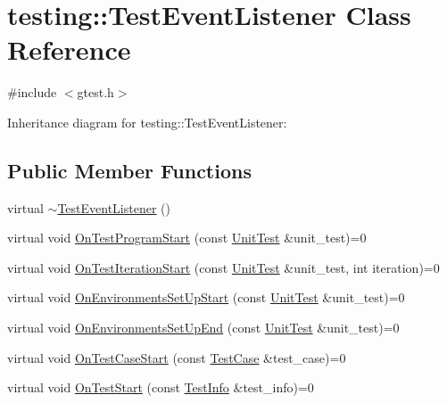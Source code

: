 \hypertarget{classtesting_1_1_test_event_listener}{}\section{testing\+:\+:Test\+Event\+Listener Class Reference}
\label{classtesting_1_1_test_event_listener}


{\ttfamily \#include $<$gtest.\+h$>$}



Inheritance diagram for testing\+:\+:Test\+Event\+Listener\+:
\subsection*{Public Member Functions}
\begin{DoxyCompactItemize}
\item 
virtual \hyperlink{classtesting_1_1_test_event_listener_a4512d19e7a108ec4926239ec1ea85d63}{$\sim$\+Test\+Event\+Listener} ()
\item 
virtual void \hyperlink{classtesting_1_1_test_event_listener_a5f6c84f39851e8a603a2d2e10063816b}{On\+Test\+Program\+Start} (const \hyperlink{classtesting_1_1_unit_test}{Unit\+Test} \&unit\+\_\+test)=0
\item 
virtual void \hyperlink{classtesting_1_1_test_event_listener_a60cc09b7907cb329d152eb5e7133bdeb}{On\+Test\+Iteration\+Start} (const \hyperlink{classtesting_1_1_unit_test}{Unit\+Test} \&unit\+\_\+test, int iteration)=0
\item 
virtual void \hyperlink{classtesting_1_1_test_event_listener_aa6502e534919605be45f26a6daf9a40c}{On\+Environments\+Set\+Up\+Start} (const \hyperlink{classtesting_1_1_unit_test}{Unit\+Test} \&unit\+\_\+test)=0
\item 
virtual void \hyperlink{classtesting_1_1_test_event_listener_aaa1021d75f5dbf3f05c829c1cc520341}{On\+Environments\+Set\+Up\+End} (const \hyperlink{classtesting_1_1_unit_test}{Unit\+Test} \&unit\+\_\+test)=0
\item 
virtual void \hyperlink{classtesting_1_1_test_event_listener_ab4ed885d63f5bbff8076c1329b3dfe36}{On\+Test\+Case\+Start} (const \hyperlink{classtesting_1_1_test_case}{Test\+Case} \&test\+\_\+case)=0
\item 
virtual void \hyperlink{classtesting_1_1_test_event_listener_ab4f6a0ca16ae75daf385b3b5914e1048}{On\+Test\+Start} (const \hyperlink{classtesting_1_1_test_info}{Test\+Info} \&test\+\_\+info)=0
\item 

\end{DoxyCompactItemize}
